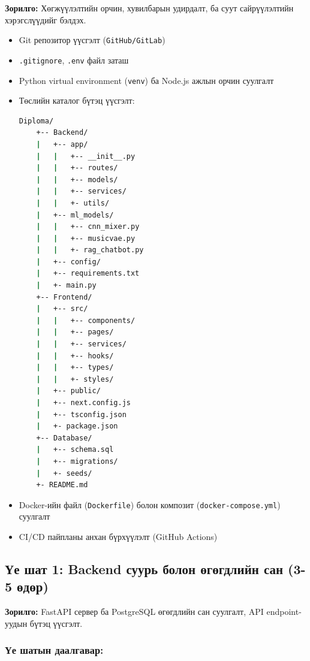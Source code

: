 \textbf{Зорилго:} Хөгжүүлэлтийн орчин, хувилбарын удирдалт, ба суут сайрүүлэлтийн хэрэгслүүдийг бэлдэх.

\begin{itemize}
    \item Git репозитор үүсгэлт (\texttt{GitHub/GitLab})
    \item \texttt{.gitignore}, \texttt{.env} файл заташ
    \item Python virtual environment (\texttt{venv}) ба Node.js ажлын орчин суулгалт
    \item Төслийн каталог бүтэц үүсгэлт:
    \begin{lstlisting}[language=bash]
    Diploma/
    +-- Backend/
    |   +-- app/
    |   |   +-- __init__.py
    |   |   +-- routes/
    |   |   +-- models/
    |   |   +-- services/
    |   |   +- utils/
    |   +-- ml_models/
    |   |   +-- cnn_mixer.py
    |   |   +-- musicvae.py
    |   |   +- rag_chatbot.py
    |   +-- config/
    |   +-- requirements.txt
    |   +- main.py
    +-- Frontend/
    |   +-- src/
    |   |   +-- components/
    |   |   +-- pages/
    |   |   +-- services/
    |   |   +-- hooks/
    |   |   +-- types/
    |   |   +- styles/
    |   +-- public/
    |   +-- next.config.js
    |   +-- tsconfig.json
    |   +- package.json
    +-- Database/
    |   +-- schema.sql
    |   +-- migrations/
    |   +- seeds/
    +- README.md
    \end{lstlisting}
    
    \item Docker-ийн файл (\texttt{Dockerfile}) болон композит (\texttt{docker-compose.yml}) суулгалт
    \item CI/CD пайпланы анхан бүрхүүлэлт (GitHub Actions)
\end{itemize}

\subsection{Үе шат 1: Backend суурь болон өгөгдлийн сан (3-5 өдөр)}

\textbf{Зорилго:} FastAPI сервер ба PostgreSQL өгөгдлийн сан суулгалт, API endpoint-уудын бүтэц үүсгэлт.

\subsubsection{Үе шатын даалгавар:}

